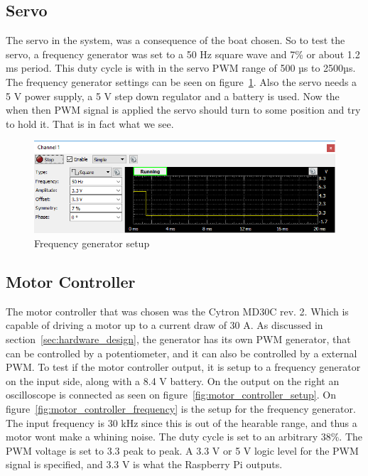 \subsection{Servo}
The servo in the system, was a consequence of the boat chosen.  So to test the servo, a frequency generator was set to a 50 Hz square wave and 7\% or about 1.2 ms period. This duty cycle is with in the servo PWM range of 500 µs to 2500µs. The frequency generator settings can be seen on figure~\ref{fig:servopwmtest}. Also the servo needs a 5 V power supply, a 5 V step down regulator and a battery is used. Now the when then PWM signal is applied the servo should turn to some position and try to hold it. That is in fact what we see. 

\begin{figure}[h]
\centering
\includegraphics[width=0.7\linewidth]{Images/Implementation/Servo_PWM_test}
\caption{Frequency generator setup}
\label{fig:servopwmtest}
\end{figure}

\subsection{Motor Controller}
\label{sec:motor_controller}
The motor controller that was chosen was the Cytron MD30C rev. 2. Which is capable of driving a motor up to a current draw of 30 A. As discussed in section~\ref{sec:hardware_design}, the generator has its own PWM generator, that can be controlled by a potentiometer, and it can also be controlled by a external PWM. To test if the motor controller output, it is setup to a frequency generator on the input side, along with a 8.4 V battery. On the output on the right an oscilloscope is connected as seen on figure~\ref{fig:motor_controller_setup}. On figure~\ref{fig:motor_controller_frequency} is the setup for the frequency generator. The input frequency is 30 kHz since this is out of the hearable range, and thus a motor wont make a whining noise. The duty cycle is set to an arbitrary 38\%. The PWM voltage is set to 3.3 peak to peak. A 3.3 V or 5 V logic level for the PWM signal is specified, and 3.3 V is what the Raspberry Pi outputs. 


